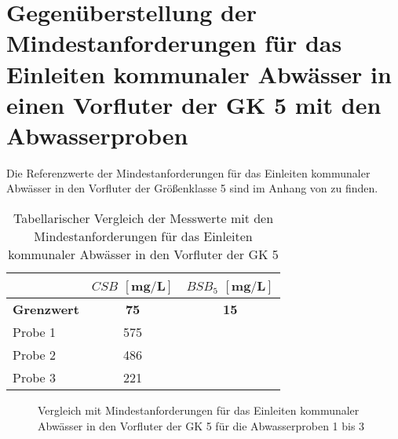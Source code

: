 \section{Gegenüberstellung der Mindestanforderungen für das Einleiten kommunaler Abwässer in einen Vorfluter der GK 5 mit den Abwasserproben}
Die Referenzwerte der Mindestanforderungen für das Einleiten kommunaler Abwässer in den Vorfluter der Größenklasse 5 sind im Anhang von \cite[S. 29]{Skript} zu finden.
\vspace*{-2.5mm}
\renewcommand{\arraystretch}{1.2}
\begin{table}[h!]
	\centering
	\caption{Tabellarischer Vergleich der Messwerte mit den Mindestanforderungen für das Einleiten kommunaler Abwässer in den Vorfluter der GK 5}
	\label{tab_vgl}
	\begin{tabulary}{1.2\textwidth}{l|C|C}
		\hline
		 & \textbf{$CSB$} $\boldsymbol{\left[\si{\milli\gram\per\liter}\right]}$ & \textbf{$BSB_5$} $\boldsymbol{\left[\si{\milli\gram\per\liter}\right]}$\\
		\hline
		\textbf{Grenzwert} & \textbf{75} & \textbf{15}  \\
		\hline
		Probe 1 & 575 &  \\
		Probe 2 & 486 &  \\
		Probe 3 & 221 &  \\
		\hline
	\end{tabulary}
\end{table}
\FloatBarrier

\begin{figure}[h!]
	\caption{Vergleich mit Mindestanforderungen für das Einleiten kommunaler Abwässer in den Vorfluter der GK 5 für die Abwasserproben 1 bis 3}
	\label{Balkendiagramm}
\end{figure}
\FloatBarrier


